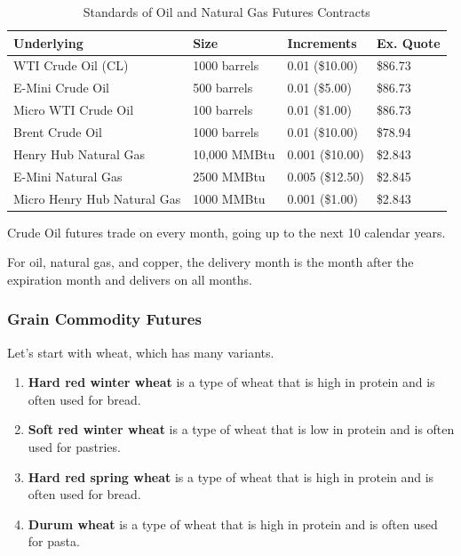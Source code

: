 \documentclass{article}
\begin{document}
      \begin{table}[H]
        \centering
        \begin{tabular}{|l|l|l|l|}
        \hline
        \textbf{Underlying} & \textbf{Size} & \textbf{Increments} & \textbf{Ex. Quote} \\ \hline
        WTI Crude Oil (CL) & 1000 barrels & 0.01 (\$10.00) & \$86.73\\ \hline
        E-Mini Crude Oil   & 500 barrels & 0.01 (\$5.00) & \$86.73 \\ \hline
        Micro WTI Crude Oil & 100 barrels & 0.01 (\$1.00) & \$86.73 \\ \hline
        Brent Crude Oil & 1000 barrels & 0.01 (\$10.00) & \$78.94 \\ \hline
        Henry Hub Natural Gas & 10,000 MMBtu & 0.001 (\$10.00) & \$2.843 \\ \hline
        E-Mini Natural Gas & 2500 MMBtu & 0.005 (\$12.50) & \$2.845 \\ \hline
        Micro Henry Hub Natural Gas & 1000 MMBtu & 0.001 (\$1.00) & \$2.843 \\ \hline
        \end{tabular}
        \caption{Standards of Oil and Natural Gas Futures Contracts}
        \label{tab:oil_natural_gas}
      \end{table}

      Crude Oil futures trade on every month, going up to the next 10 calendar years. 

      For oil, natural gas, and copper, the delivery month is the month after the expiration month and delivers on all months. 

    \subsubsection{Grain Commodity Futures}

      Let's start with wheat, which has many variants. 
      \begin{enumerate}
        \item \textbf{Hard red winter wheat} is a type of wheat that is high in protein and is often used for bread. 
        \item \textbf{Soft red winter wheat} is a type of wheat that is low in protein and is often used for pastries. 
        \item \textbf{Hard red spring wheat} is a type of wheat that is high in protein and is often used for bread. 
        \item \textbf{Durum wheat} is a type of wheat that is high in protein and is often used for pasta.
      \end{enumerate}
\end{document}
